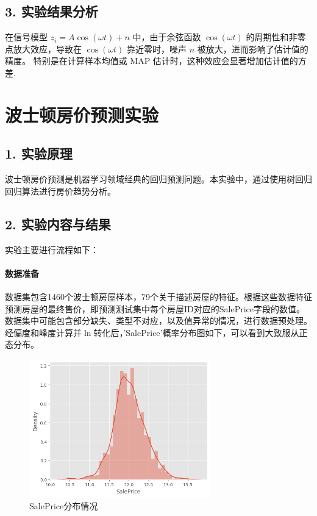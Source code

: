 \documentclass[12pt]{ctexart}
\begin{document}
\subsection*{3. 实验结果分析}

在信号模型 $z_i = A \cos(\omega t) + n$ 中，由于余弦函数 $\cos(\omega t)$ 的周期性和非零点放大效应，导致在 $\cos(\omega t)$ 靠近零时，噪声 $n$ 被放大，进而影响了估计值的精度。
特别是在计算样本均值或 MAP 估计时，这种效应会显著增加估计值的方差.

\section*{波士顿房价预测实验}

\subsection*{1. 实验原理}

波士顿房价预测是机器学习领域经典的回归预测问题。本实验中，通过使用树回归回归算法进行房价趋势分析。

\subsection*{2. 实验内容与结果}

实验主要进行流程如下：

\paragraph{数据准备}

数据集包含1460个波士顿房屋样本，79个关于描述房屋的特征。根据这些数据特征预测房屋的最终售价，即预测测试集中每个房屋ID对应的SalePrice字段的数值。
数据集中可能包含部分缺失、类型不对应，以及值异常的情况，进行数据预处理。
经偏度和峰度计算并$\ln$转化后，'SalePrice'概率分布图如下，可以看到大致服从正态分布。

\begin{figure}[H]
    \centering
    \includegraphics[width=0.7\textwidth]{image/output4-2.png}
    \caption{SalePrice分布情况}
\end{figure}
\end{document}
